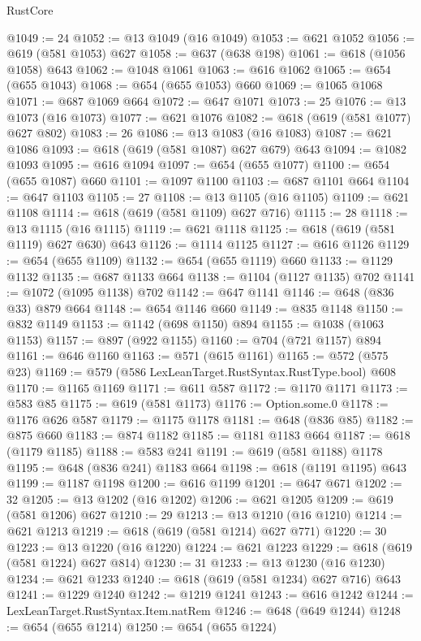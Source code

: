 \begin{lexlean}{RustCore}
\begin{coremodule}
@1049 := 24
@1052 := @13 @1049 (@16 @1049)
@1053 := @621 @1052
@1056 := @619 (@581 @1053) @627
@1058 := @637 (@638 @198)
@1061 := @618 (@1056 @1058) @643
@1062 := @1048 @1061
@1063 := @616 @1062
@1065 := @654 (@655 @1043)
@1068 := @654 (@655 @1053) @660
@1069 := @1065 @1068
@1071 := @687 @1069 @664
@1072 := @647 @1071
@1073 := 25
@1076 := @13 @1073 (@16 @1073)
@1077 := @621 @1076
@1082 := @618 (@619 (@581 @1077) @627 @802)
@1083 := 26
@1086 := @13 @1083 (@16 @1083)
@1087 := @621 @1086
@1093 := @618 (@619 (@581 @1087) @627 @679) @643
@1094 := @1082 @1093
@1095 := @616 @1094
@1097 := @654 (@655 @1077)
@1100 := @654 (@655 @1087) @660
@1101 := @1097 @1100
@1103 := @687 @1101 @664
@1104 := @647 @1103
@1105 := 27
@1108 := @13 @1105 (@16 @1105)
@1109 := @621 @1108
@1114 := @618 (@619 (@581 @1109) @627 @716)
@1115 := 28
@1118 := @13 @1115 (@16 @1115)
@1119 := @621 @1118
@1125 := @618 (@619 (@581 @1119) @627 @630) @643
@1126 := @1114 @1125
@1127 := @616 @1126
@1129 := @654 (@655 @1109)
@1132 := @654 (@655 @1119) @660
@1133 := @1129 @1132
@1135 := @687 @1133 @664
@1138 := @1104 (@1127 @1135) @702
@1141 := @1072 (@1095 @1138) @702
@1142 := @647 @1141
@1146 := @648 (@836 @33) @879 @664
@1148 := @654 @1146 @660
@1149 := @835 @1148
@1150 := @832 @1149
@1153 := @1142 (@698 @1150) @894
@1155 := @1038 (@1063 @1153)
@1157 := @897 (@922 @1155)
@1160 := @704 (@721 @1157) @894
@1161 := @646 @1160
@1163 := @571 (@615 @1161)
@1165 := @572 (@575 @23)
@1169 := @579 (@586 LexLeanTarget.RustSyntax.RustType.bool) @608
@1170 := @1165 @1169
@1171 := @611 @587
@1172 := @1170 @1171
@1173 := @583 @85
@1175 := @619 (@581 @1173)
@1176 := Option.some.{0}
@1178 := @1176 @626 @587
@1179 := @1175 @1178
@1181 := @648 (@836 @85)
@1182 := @875 @660
@1183 := @874 @1182
@1185 := @1181 @1183 @664
@1187 := @618 (@1179 @1185)
@1188 := @583 @241
@1191 := @619 (@581 @1188) @1178
@1195 := @648 (@836 @241) @1183 @664
@1198 := @618 (@1191 @1195) @643
@1199 := @1187 @1198
@1200 := @616 @1199
@1201 := @647 @671
@1202 := 32
@1205 := @13 @1202 (@16 @1202)
@1206 := @621 @1205
@1209 := @619 (@581 @1206) @627
@1210 := 29
@1213 := @13 @1210 (@16 @1210)
@1214 := @621 @1213
@1219 := @618 (@619 (@581 @1214) @627 @771)
@1220 := 30
@1223 := @13 @1220 (@16 @1220)
@1224 := @621 @1223
@1229 := @618 (@619 (@581 @1224) @627 @814)
@1230 := 31
@1233 := @13 @1230 (@16 @1230)
@1234 := @621 @1233
@1240 := @618 (@619 (@581 @1234) @627 @716) @643
@1241 := @1229 @1240
@1242 := @1219 @1241
@1243 := @616 @1242
@1244 := LexLeanTarget.RustSyntax.Item.natRem
@1246 := @648 (@649 @1244)
@1248 := @654 (@655 @1214)
@1250 := @654 (@655 @1224)

\end{coremodule}
\end{lexlean}

